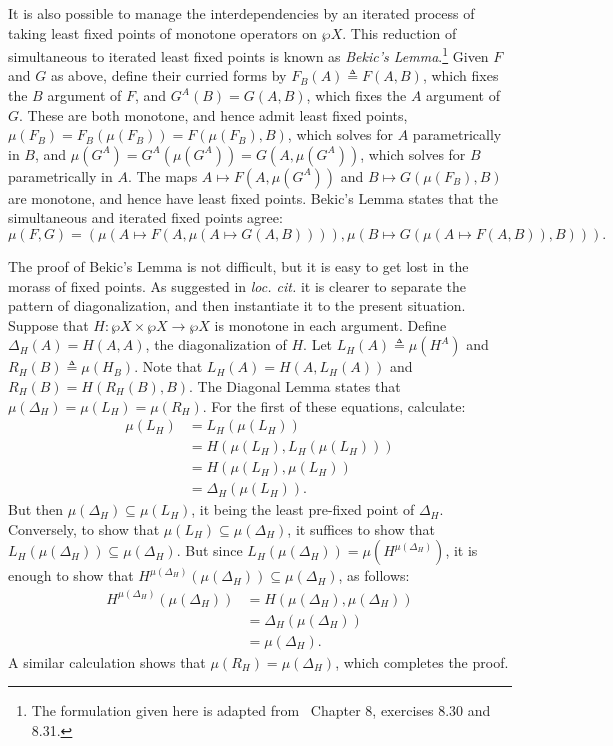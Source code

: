 \documentclass[11pt,twoside]{article}
\newcommand{\eqdef}{\mathrel{\triangleq}}
\begin{document}
It is also possible to manage the interdependencies by an iterated process of taking least
fixed points of monotone operators on $\wp{X}$.  This reduction of simultaneous to iterated
least fixed points is known as \emph{Bekic's Lemma}.\footnote{The formulation given here
  is adapted from~\citet{davey-priestley} Chapter 8, exercises 8.30 and 8.31.}  Given $F$
and $G$ as above, define their curried forms by $F_{B}(A)\eqdef{} F(A,B)$, which fixes the
$B$ argument of $F$, and $G^{A}(B)=G(A,B)$, which fixes the $A$ argument of $G$.  These
are both monotone, and hence admit least fixed points,
$\mu(F_{B})=F_{B}(\mu(F_{B}))=F(\mu(F_{B}),B)$, which solves for $A$ parametrically in
$B$, and $\mu(G^{A})=G^{A}(\mu(G^{A}))=G(A,\mu(G^{A}))$, which solves for $B$ parametrically in
$A$.  The maps $A\mapsto F(A,\mu(G^{A}))$ and $B\mapsto G(\mu(F_{B}),B)$ are monotone, and hence have
least fixed points.  Bekic's Lemma states that the simultaneous and iterated fixed points
agree:
$$\mu(F,G) = (\mu(A\mapsto F(A,\mu(A\mapsto G(A,B)))),\mu(B\mapsto G(\mu(A\mapsto F(A,B)),B))).$$

The proof of Bekic's Lemma is not difficult, but it is easy to get lost in the morass of
fixed points.  As suggested in \textit{loc. cit.} it is clearer to separate the pattern of
diagonalization, and then instantiate it to the present situation.  Suppose that
$H:\wp{X}\times\wp{X}\to\wp{X}$ is monotone in each argument.  Define
$\Delta_{H}(A)=H(A,A)$, the diagonalization of $H$.  Let $L_{H}(A) \eqdef{} \mu(H^{A})$ and
$R_{H}(B) \eqdef{} \mu(H_{B})$.  Note that $L_{H}(A)=H(A,L_{H}(A))$ and
$R_{H}(B) = H(R_{H}(B),B)$.  The Diagonal Lemma states that
$\mu(\Delta_{H})=\mu(L_{H})=\mu(R_{H})$.  For the first of these equations, calculate:
\begin{align*}
  \mu(L_{H}) & = L_{H}(\mu(L_{H})) \\
           & = H(\mu(L_{H}),L_{H}(\mu(L_{H}))) \\
           & = H(\mu(L_{H}),\mu(L_{H})) \\
           & = \Delta_{H}(\mu(L_{H})).
\end{align*}
But then $\mu(\Delta_{H})\subseteq\mu(L_{H})$, it being the least pre-fixed point of
$\Delta_{H}$.  Conversely, to show that $\mu(L_{H})\subseteq\mu(\Delta_{H})$, it suffices to show that
$L_{H}(\mu(\Delta_{H}))\subseteq\mu(\Delta_{H})$.  But since $L_{H}(\mu(\Delta_{H}))=\mu(H^{\mu(\Delta_{H})})$, it is enough to
show that $H^{\mu(\Delta_{H})}(\mu(\Delta_{H}))\subseteq\mu(\Delta_{H})$, as follows:
\begin{align*}
  H^{\mu(\Delta_{H})}(\mu(\Delta_{H}))
  & = H(\mu(\Delta_{H}),\mu(\Delta_{H})) \\
  & = \Delta_{H}(\mu(\Delta_{H})) \\
  & = \mu(\Delta_{H}).
\end{align*}
A similar calculation shows that $\mu(R_{H})=\mu(\Delta_{H})$, which completes the proof.
\end{document}
